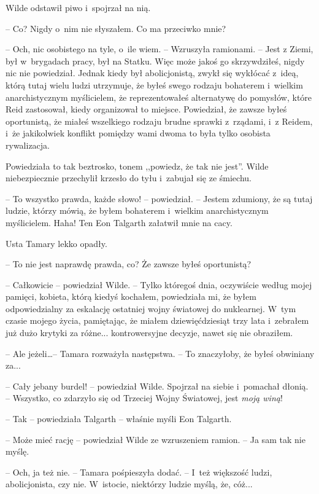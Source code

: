 \documentclass[oneside,polish,11pt,sfheadings]{mwbk}
\begin{document}
Wilde odstawił piwo i~spojrzał na nią. 

-- Co? Nigdy o~nim nie słyszałem.
Co ma przeciwko mnie?

-- Och, nic osobistego na tyle, o~ile wiem. -- Wzruszyła ramionami. -- Jest
z Ziemi, był w~brygadach pracy, był na Statku. Więc może jakoś go
skrzywdziłeś, nigdy nic nie powiedział. Jednak kiedy był abolicjonistą,
zwykł się wykłócać z~ideą, którą tutaj wielu ludzi utrzymuje, że byłeś
swego rodzaju bohaterem i~wielkim anarchistycznym myślicielem, że
reprezentowałeś alternatywę do pomysłów, które Reid zastosował, kiedy
organizował to miejsce. Powiedział, że zawsze byłeś oportunistą, że
miałeś wszelkiego rodzaju brudne sprawki z~rządami, i~z Reidem, i~że
jakikolwiek konflikt pomiędzy wami dwoma to była tylko osobista
rywalizacja.

Powiedziała to tak beztrosko, tonem ,,powiedz, że tak nie jest''. Wilde
niebezpiecznie przechylił krzesło do tyłu i~zabujał się ze śmiechu.

-- To wszystko prawda, każde słowo! -- powiedział. -- Jestem zdumiony, że
są tutaj ludzie, którzy mówią, że byłem bohaterem i~wielkim
anarchistycznym myślicielem. Haha! Ten Eon Talgarth załatwił mnie na
cacy.

Usta Tamary lekko opadły. 

-- To nie jest naprawdę prawda, co? Że zawsze
byłeś oportunistą?

-- Całkowicie -- powiedział Wilde. -- Tylko któregoś dnia, oczywiście
według mojej pamięci, kobieta, którą kiedyś kochałem, powiedziała mi, że
byłem odpowiedzialny za eskalację ostatniej wojny światowej do
nuklearnej. W~tym czasie mojego życia, pamiętając, że miałem
dziewięćdziesiąt trzy lata i~zebrałem już dużo krytyki za różne...
kontrowersyjne decyzje, nawet się nie obraziłem.

-- Ale jeżeli\ldots -- Tamara rozważyła następstwa. -- To znaczyłoby, że byłeś
obwiniany za...

-- Cały jebany burdel! -- powiedział Wilde. Spojrzał na siebie i~pomachał
dłonią. -- Wszystko, co zdarzyło się od Trzeciej Wojny Światowej, jest
\emph{moją winą}!

-- Tak -- powiedziała Talgarth -- właśnie myśli Eon Talgarth.

-- Może mieć rację -- powiedział Wilde ze wzruszeniem ramion. -- Ja sam tak
nie myślę.

-- Och, ja też nie. -- Tamara pośpieszyła dodać. -- I~też większość ludzi,
abolicjonista, czy nie. W~istocie, niektórzy ludzie myślą, że, cóż...
\end{document}
